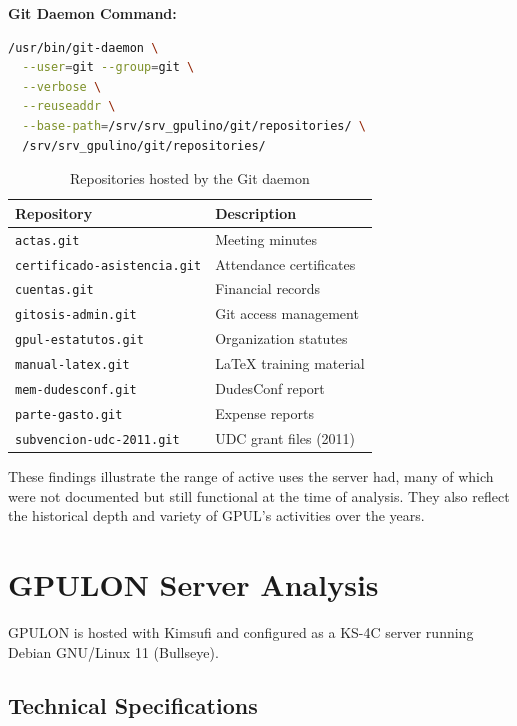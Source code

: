 \noindent
\textbf{Git Daemon Command:}

\begin{lstlisting}[language=sh]
/usr/bin/git-daemon \
  --user=git --group=git \
  --verbose \
  --reuseaddr \
  --base-path=/srv/srv_gpulino/git/repositories/ \
  /srv/srv_gpulino/git/repositories/
\end{lstlisting}

\begin{table}[H]
  \centering
  \rowcolors{2}{white}{udcgray!15}
  \caption{Repositories hosted by the Git daemon}
  \label{tab:gpulino_git_repos}
  \begin{tabular}{ll}
    \rowcolor{udcpink!25}
    \textbf{Repository} & \textbf{Description} \\
    \hline
    \texttt{actas.git} & Meeting minutes \\
    \texttt{certificado-asistencia.git} & Attendance certificates \\
    \texttt{cuentas.git} & Financial records \\
    \texttt{gitosis-admin.git} & Git access management \\
    \texttt{gpul-estatutos.git} & Organization statutes \\
    \texttt{manual-latex.git} & LaTeX training material \\
    \texttt{mem-dudesconf.git} & DudesConf report \\
    \texttt{parte-gasto.git} & Expense reports \\
    \texttt{subvencion-udc-2011.git} & UDC grant files (2011) \\
  \end{tabular}
\end{table}

These findings illustrate the range of active uses the server had, many of which were not documented but still functional at the time of analysis. They also reflect the historical depth and variety of GPUL's activities over the years.

\section{GPULON Server Analysis}

GPULON is hosted with Kimsufi and configured as a KS-4C server running Debian GNU/Linux 11 (Bullseye).

\subsection*{Technical Specifications}

